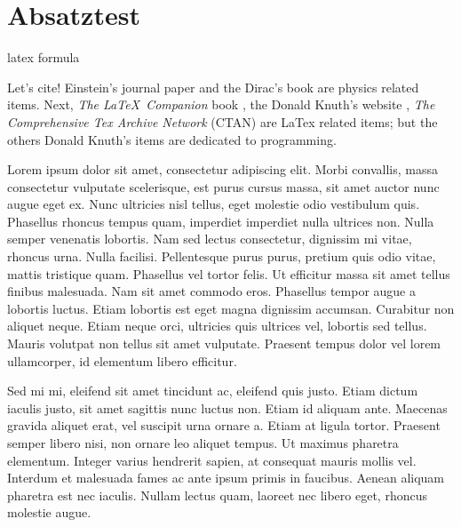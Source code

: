\section{Absatztest}

\gls{latex}
\Gls{formula}



Let's cite! Einstein's journal paper \cite{einstein} and the Dirac's 
book \cite{dirac} are physics related items. 
Next, \textit{The \LaTeX\ Companion} book \cite{latexcompanion}, the Donald 
Knuth's website \cite{knuthwebsite}, \textit{The Comprehensive Tex Archive 
Network} (CTAN) \cite{ctan} are LaTex related items; but the others Donald 
Knuth's items \cite{knuth-fa,knuth-acp} are dedicated to programming. 




Lorem ipsum dolor sit amet, consectetur adipiscing elit. Morbi convallis, massa consectetur vulputate scelerisque, est purus cursus massa, sit amet auctor nunc augue eget ex. Nunc ultricies nisl tellus, eget molestie odio vestibulum quis. Phasellus rhoncus tempus quam, imperdiet imperdiet nulla ultrices non. Nulla semper venenatis lobortis. Nam sed lectus consectetur, dignissim mi vitae, rhoncus urna. Nulla facilisi. Pellentesque purus purus, pretium quis odio vitae, mattis tristique quam. Phasellus vel tortor felis. Ut efficitur massa sit amet tellus finibus malesuada. Nam sit amet commodo eros. Phasellus tempor augue a lobortis luctus. Etiam lobortis est eget magna dignissim accumsan. Curabitur non aliquet neque. Etiam neque orci, ultricies quis ultrices vel, lobortis sed tellus. Mauris volutpat non tellus sit amet vulputate. Praesent tempus dolor vel lorem ullamcorper, id elementum libero efficitur.

Sed mi mi, eleifend sit amet tincidunt ac, eleifend quis justo. Etiam dictum iaculis justo, sit amet sagittis nunc luctus non. Etiam id aliquam ante. Maecenas gravida aliquet erat, vel suscipit urna ornare a. Etiam at ligula tortor. Praesent semper libero nisi, non ornare leo aliquet tempus. Ut maximus pharetra elementum. Integer varius hendrerit sapien, at consequat mauris mollis vel. Interdum et malesuada fames ac ante ipsum primis in faucibus. Aenean aliquam pharetra est nec iaculis. Nullam lectus quam, laoreet nec libero eget, rhoncus molestie augue.

